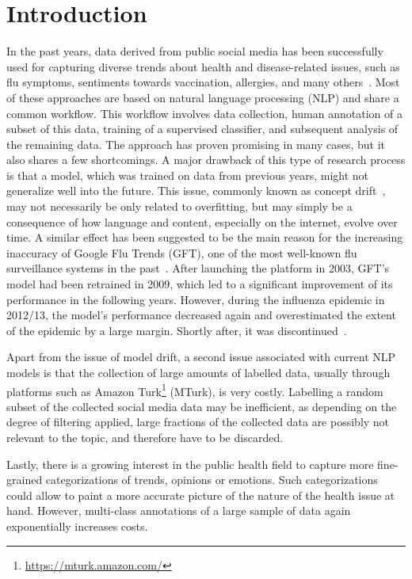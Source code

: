 \documentclass[a4paper, 11pt]{article}
\begin{document}
\section{Introduction}
In the past years, data derived from public social media has been successfully used for capturing diverse trends about health and disease-related issues, such as flu symptoms, sentiments towards vaccination, allergies, and many others~\cite{culotta2010towards,paul2011you,Salathe2011a,paul2012model,parker2013framework}.
Most of these approaches are based on natural language processing (NLP) and share a common workflow. 
This workflow involves data collection, human annotation of a subset of this data, training of a supervised classifier, and subsequent analysis of the remaining data.
The approach has proven promising in many cases, but it also shares a few shortcomings.
A major drawback of this type of research process is that a model, which was trained on data from previous years, might not generalize well into the future.
This issue, commonly known as concept drift~\cite{widmer1996learning}, may not necessarily be only related to overfitting, but may simply be a consequence of how language and content, especially on the internet, evolve over time.
A similar effect has been suggested to be the main reason for the increasing inaccuracy of Google Flu Trends (GFT), one of the most well-known flu surveillance systems in the past~\cite{ginsberg2009detecting}. 
After launching the platform in 2003, GFT's model had been retrained in 2009, which led to a significant improvement of its performance in the following years.
However, during the influenza epidemic in 2012/13, the model's performance decreased again and overestimated the extent of the epidemic by a large margin.
Shortly after, it was discontinued~\cite{Lazer2014,Butler2013}.\par

Apart from the issue of model drift, a second issue associated with current NLP models is that the collection of large amounts of labelled data, usually through platforms such as Amazon Turk\footnote{\url{https://mturk.amazon.com/}} (MTurk), is very costly.
Labelling a random subset of the collected social media data may be inefficient, as depending on the degree of filtering applied, large fractions of the collected data are possibly not relevant to the topic, and therefore have to be discarded.\par

Lastly, there is a growing interest in the public health field to capture more fine-grained categorizations of trends, opinions or emotions. 
Such categorizations could allow to paint a more accurate picture of the nature of the health issue at hand.
However, multi-class annotations of a large sample of data again exponentially increases costs.\par
\end{document}
